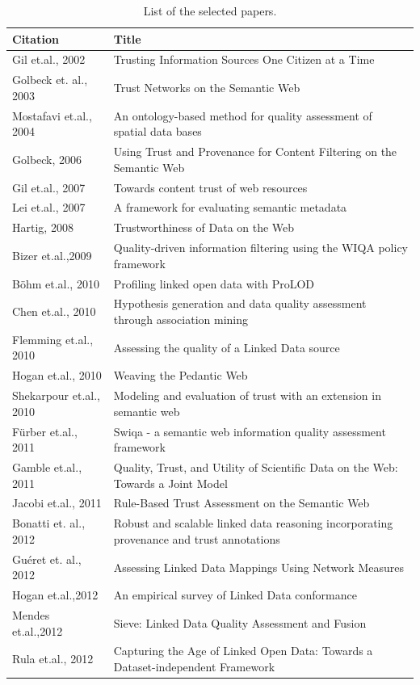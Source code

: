 \begin{table}[htb]
\caption{List of the selected papers.} 
\label{selectedpapers}
\begin{tabular}{ | p{2.7cm} | p{10cm} | }
\hline
\textbf{Citation} & \textbf{Title} \\
\hline
Gil et.al., 2002 & Trusting Information Sources One Citizen at a Time \\
\hline
Golbeck et. al., 2003 & Trust Networks on the Semantic Web \\
\hline
Mostafavi et.al., 2004 & An ontology-based method for quality assessment of spatial data bases\\
\hline
Golbeck, 2006 & Using Trust and Provenance for Content Filtering on the Semantic Web \\
\hline
Gil et.al., 2007 & Towards content trust of web resources \\
\hline
Lei et.al., 2007 & A framework for evaluating semantic metadata \\
\hline
Hartig, 2008 & Trustworthiness of Data on the Web \\
\hline
Bizer et.al.,2009 & Quality-driven information filtering using the WIQA policy framework \\	
\hline
B\"ohm et.al., 2010 & Profiling linked open data with ProLOD \\	
\hline
Chen et.al., 2010 & Hypothesis generation and data quality assessment through association mining \\
\hline
Flemming et.al., 2010 & Assessing the quality of a Linked Data source \\
\hline
Hogan et.al., 2010 & Weaving the Pedantic Web \\
\hline
Shekarpour et.al., 2010 & Modeling and evaluation of trust with an extension in semantic web \\
\hline
F\"urber et.al., 2011 & Swiqa - a semantic web information quality assessment framework \\
\hline
Gamble et.al., 2011 & Quality, Trust, and Utility of Scientific Data on the Web: Towards a Joint Model \\
\hline
Jacobi et.al., 2011 & Rule-Based Trust Assessment on the Semantic Web \\
\hline
Bonatti et. al., 2012 & Robust and scalable linked data reasoning incorporating provenance and trust annotations \\
\hline
Gu\'eret et. al., 2012 & Assessing Linked Data Mappings Using Network Measures \\
\hline
Hogan et.al.,2012 & An empirical survey of Linked Data conformance \\
\hline
Mendes et.al.,2012 & Sieve: Linked Data Quality Assessment and Fusion \\
\hline
Rula et.al., 2012 & Capturing the Age of Linked Open Data: Towards a Dataset-independent Framework \\
\hline
\end{tabular}
\end{table}

